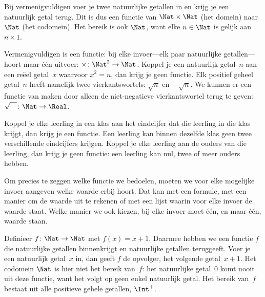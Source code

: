 \documentclass[../../../include/open-logic-section]{subfiles}
\begin{document}
\begin{ex}
Bij vermenigvuldigen voer je twee natuurlijke getallen in en krijg je een
natuurlijk getal terug. Dit is dus een functie van $\Nat \times \Nat$ (het
domein) naar $\Nat$ (het codomein). Het bereik is ook $\Nat$, want elke
$n \in \Nat$ is gelijk aan $n \times 1$.
\end{ex}

\begin{ex}
Vermenigvuldigen is een functie: bij elke invoer---elk paar natuurlijke
getallen---hoort maar één uitvoer: $\times \colon \Nat^2 \to
\Nat$. Koppel je een natuurlijk getal~$n$ aan een reëel getal~$x$ waarvoor
$x^2 = n$, dan krijg je geen functie. Elk positief geheel getal~$n$ heeft
namelijk twee vierkantswortels: $\sqrt{n}$ en~$-\sqrt{n}$. We kunnen er een
functie van maken door alleen de niet-negatieve vierkantswortel terug te geven:
$\sqrt{\phantom{X}} \colon \Nat \to \Real$.
\end{ex}

\begin{ex}
Koppel je elke leerling in een klas aan het eindcijfer dat die leerling in die
klas krijgt, dan krijg je een functie. Een leerling kan binnen dezelfde klas
geen twee verschillende eindcijfers krijgen. Koppel je elke leerling aan de
ouders van die leerling, dan krijg je geen functie: een leerling kan nul, twee
of meer ouders hebben.
\end{ex}

\begin{explain}
Om precies te zeggen welke functie we bedoelen, moeten we voor elke mogelijke
invoer aangeven welke waarde erbij hoort. Dat kan met een formule, met een
manier om de waarde uit te rekenen of met een lijst waarin voor elke invoer de
waarde staat.
Welke manier we ook kiezen, bij elke invoer moet één, en maar één, waarde staan.
\end{explain}


\begin{ex}
Definieer $f \colon \Nat \to \Nat$ met $f(x) = x+1$. Daarmee hebben we een
functie $f$ die natuurlijke getallen binnenkrijgt en natuurlijke getallen
teruggeeft. Voer je een natuurlijk getal~$x$ in, dan geeft $f$ de opvolger,
het volgende getal~$x+1$. Het codomein $\Nat$ is hier niet het bereik van~$f$:
het natuurlijke getal~$0$ komt nooit uit deze functie, want het volgt op geen enkel
natuurlijk getal. Het bereik van~$f$ bestaat uit alle positieve gehele
getallen, $\Int^{+}$.
\end{ex}
\end{document}
